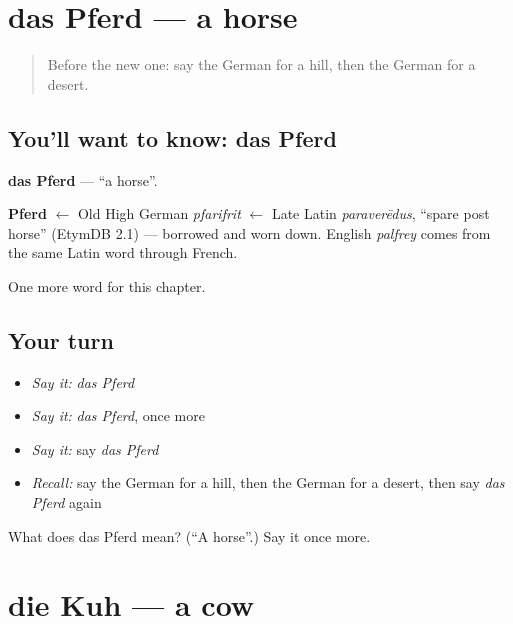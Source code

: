 \section[das Pferd]{das Pferd — a horse}

\label{lesson:GE-C85-pferd}



\begin{quote}
Before the new one: say the German for a hill, then the German for a desert.
\end{quote}

\subsection*{You'll want to know: das Pferd}
\textbf{das Pferd} — \textquotedblleft{}a horse\textquotedblright{}.

\begin{cousinweb}
\textbf{Pferd} $\leftarrow$ Old High German \emph{pfarifrit} $\leftarrow$ Late Latin \emph{paraverēdus}, \textquotedblleft{}spare post horse\textquotedblright{} (EtymDB 2.1) — borrowed and worn down. English \emph{palfrey} comes from the same Latin word through French.
\end{cousinweb}

\begin{grammarlens}[title={What you've built}]
One more word for this chapter.
\end{grammarlens}

\subsection*{Your turn}
\begin{itemize}
\raggedright
  \item \emph{Say it:} \emph{das Pferd}
  \item \emph{Say it:} \emph{das Pferd}, once more
  \item \emph{Say it:} say \emph{das Pferd}
  \item \emph{Recall:} say the German for a hill, then the German for a desert, then say \emph{das Pferd} again
\end{itemize}

\begin{tcolorbox}[breakable,colback=teal!4,colframe=teal!35!black,title={Before you move on}]
What does das Pferd mean? (\textquotedblleft{}A horse\textquotedblright{}.) Say it once more.
\end{tcolorbox}
\section[die Kuh]{die Kuh — a cow}

